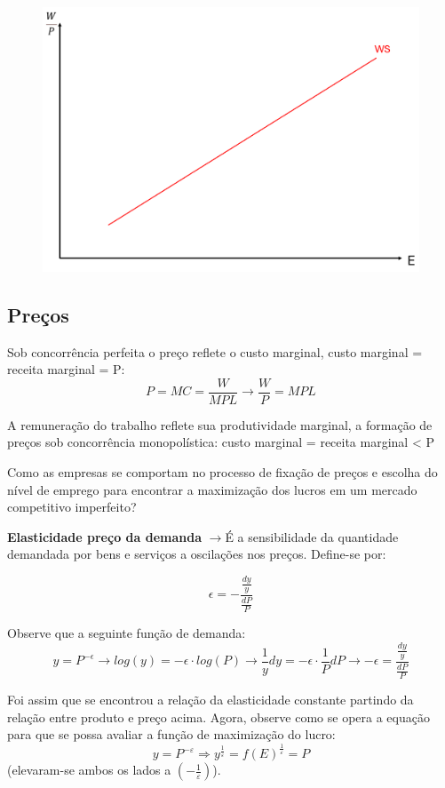\documentclass[a4paper,12pt]{article}[abntex2]
\begin{document}
\begin{figure}[H]
    \centering
    \includegraphics[width=0.7\linewidth]{Imagens/a5i9.png}
\end{figure}

\subsection{\textbf{Preços}}
Sob concorrência perfeita o preço reflete o custo marginal, custo marginal = receita marginal = P:
\[
P=MC=\frac{W}{MPL}\rightarrow\frac{W}{P}=MPL
\]

A remuneração do trabalho reflete sua produtividade marginal, a formação de preços sob concorrência monopolística: custo marginal = receita marginal < P

Como as empresas se comportam no processo de fixação de preços e escolha do nível de emprego para encontrar a maximização dos lucros em um mercado competitivo imperfeito? 

\textbf{Elasticidade preço da demanda}  \(\rightarrow\)É a sensibilidade da quantidade demandada por bens e serviços a oscilações nos preços. Define-se por: 

\[
\epsilon=-\frac{\frac{dy}{y}}{\frac{dP}{P}}
\]

Observe que a seguinte função de demanda:
\[
y=P^{-\epsilon} \rightarrow log(y)=-\epsilon\cdot log(P) \rightarrow \frac{1}{y}dy=-\epsilon \cdot \frac{1}{P}dP \rightarrow -\epsilon=\frac{\frac{dy}{y}}{\frac{dP}{P}}
\]

Foi assim que se encontrou a relação da elasticidade constante partindo da relação entre produto e preço acima. Agora, observe como se opera a equação para que se possa avaliar a função de maximização do lucro: 
\[ y = P^{-\varepsilon} \Rightarrow y^{\frac{1}{\varepsilon}} = f(E)^{\frac{1}{\varepsilon}} = P \]
(elevaram-se ambos os lados a \( \left(-\frac{1}{\varepsilon} \right) \)).
\end{document}
